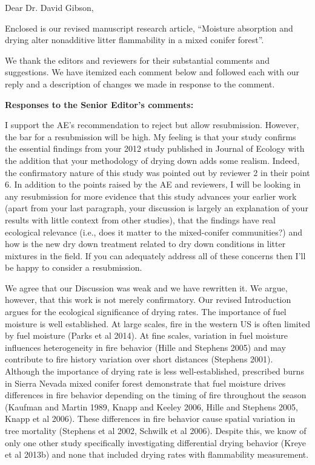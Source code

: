 \documentclass[letterpaper, 12pt]{letter}
\begin{document}
\begin{letter}{}

\opening{Dear Dr. David Gibson,}

Enclosed is our revised manuscript research article, ``Moisture absorption and drying alter nonadditive litter flammability in a mixed conifer forest''.

We thank the editors and reviewers for their substantial comments and
suggestions. We have itemized each comment below and followed each with our
reply and a description of changes we made in response to the comment.

{\bf Responses to the Senior Editor's comments:}

\begin{quoting}
  I support the AE's recommendation to reject but allow resubmission. However,
  the bar for a resubmission will be high. My feeling is that your study
  confirms the essential findings from your 2012 study published in Journal of
  Ecology with the addition that your methodology of drying down adds some
  realism. Indeed, the confirmatory nature of this study was pointed out by
  reviewer 2 in their point 6. In addition to the points raised by the AE and
  reviewers, I will be looking in any resubmission for more evidence that this
  study advances your earlier work (apart from your last paragraph, your
  discussion is largely an explanation of your results with little context from
  other studies), that the findings have real ecological relevance (i.e., does
  it matter to the mixed-conifer communities?) and how is the new dry down
  treatment related to dry down conditions in litter mixtures in the field. If
  you can adequately address all of these concerns then I'll be happy to
  consider a resubmission.
\end{quoting}

We agree that our Discussion was weak and we have rewritten it. We argue,
however, that this work is not merely confirmatory. Our revised Introduction
argues for the ecological significance of drying rates. The importance of fuel
moisture is well established. At large scales, fire in the western US is often
limited by fuel moisture (Parks et al 2014). At fine scales, variation in fuel
moisture influences heterogeneity in fire behavior (Hille and Stephens 2005)
and may contribute to fire history variation over short distances (Stephens
2001). Although the importance of drying rate is less well-established,
prescribed burns in Sierra Nevada mixed conifer forest demonstrate that fuel
moisture drives differences in fire behavior depending on the timing of fire
throughout the season (Kaufman and Martin 1989, Knapp and Keeley 2006, Hille
and Stephens 2005, Knapp et al 2006). These differences in fire behavior cause
spatial variation in tree mortality (Stephens et al 2002, Schwilk et al 2006).
Despite this, we know of only one other study specifically investigating
differential drying behavior (Kreye et al 2013b) and none that included drying
rates with flammability measurement.


\end{letter}
\end{document}
